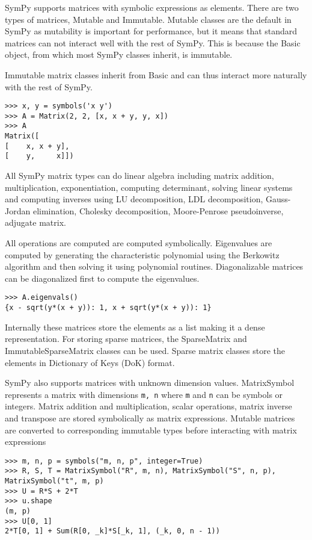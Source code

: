 SymPy supports matrices with symbolic expressions as elements. There are two
types of matrices, Mutable and Immutable. Mutable classes are the default in
SymPy as mutability is important for performance, but it means that standard
matrices can not interact well with the rest of SymPy. This is because the
Basic object, from which most SymPy classes inherit, is immutable.

Immutable matrix classes inherit from Basic and can thus interact more
naturally with the rest of SymPy.

\begin{verbatim}
>>> x, y = symbols('x y')
>>> A = Matrix(2, 2, [x, x + y, y, x])
>>> A
Matrix([
[    x, x + y],
[    y,     x]])
\end{verbatim}

All SymPy matrix types can do linear algebra including matrix addition,
multiplication, exponentiation, computing determinant, solving linear
systems and computing inverses using LU decomposition, LDL decomposition,
Gauss-Jordan elimination, Cholesky decomposition, Moore-Penrose pseudoinverse,
adjugate matrix.

All operations are computed are computed symbolically. Eigenvalues are
computed by generating the characteristic polynomial using the Berkowitz
algorithm and then solving it using polynomial routines. Diagonalizable
matrices can be diagonalized first to compute the eigenvalues.

\begin{verbatim}
>>> A.eigenvals()
{x - sqrt(y*(x + y)): 1, x + sqrt(y*(x + y)): 1}
\end{verbatim}

Internally these matrices store the elements as a list making it a dense
representation. For storing sparse matrices, the SparseMatrix and
ImmutableSparseMatrix classes can be used. Sparse matrix classes store
the elements in Dictionary of Keys (DoK) format.

SymPy also supports matrices with unknown dimension values. MatrixSymbol
represents a matrix with dimensions \verb|m, n| where \verb|m| and \verb|n|
can be symbols or integers. Matrix addition and multiplication, scalar
operations, matrix inverse and transpose are stored symbolically as
matrix expressions. Mutable matrices are converted to corresponding immutable
types before interacting with matrix expressions

\begin{verbatim}
>>> m, n, p = symbols("m, n, p", integer=True)
>>> R, S, T = MatrixSymbol("R", m, n), MatrixSymbol("S", n, p), MatrixSymbol("t", m, p)
>>> U = R*S + 2*T
>>> u.shape
(m, p)
>>> U[0, 1]
2*T[0, 1] + Sum(R[0, _k]*S[_k, 1], (_k, 0, n - 1))
\end{verbatim}

